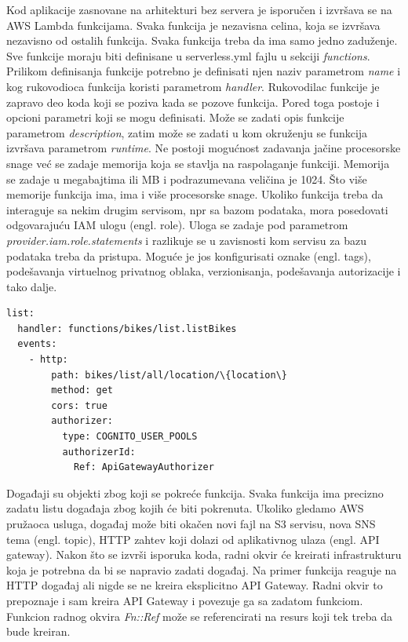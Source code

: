 \documentclass[12pt,oneside]{memoir}
\begin{document}
Kod aplikacije zasnovane na arhitekturi bez servera je isporučen i izvršava se na AWS Lambda funkcijama. Svaka funkcija je nezavisna celina, koja se izvršava nezavisno od ostalih funkcija. Svaka funkcija treba da ima samo jedno zaduženje. Sve funkcije moraju biti definisane u serverless.yml fajlu u sekciji \emph{functions}. Prilikom definisanja funkcije potrebno je definisati njen naziv parametrom \emph{name} i kog rukovodioca funkcija koristi parametrom \emph{handler}. Rukovodilac funkcije je zapravo deo koda koji se poziva kada se pozove funkcija. Pored toga postoje i opcioni parametri koji se mogu definisati. Može se zadati opis funkcije parametrom \emph{description}, zatim može se zadati u kom okruženju se funkcija izvršava parametrom \emph{runtime}. Ne postoji mogućnost zadavanja jačine procesorske snage već se zadaje memorija koja se stavlja na raspolaganje funkciji. Memorija se zadaje u megabajtima ili MB i podrazumevana veličina je 1024. Što više memorije funkcija ima, ima i više procesorske snage. Ukoliko funkcija treba da interaguje sa nekim drugim servisom, npr sa bazom podataka, mora posedovati odgovarajuću IAM ulogu (engl. role). Uloga se zadaje pod parametrom \emph{provider.iam.role.statements} i razlikuje se u zavisnosti kom servisu za bazu podataka treba da pristupa. Moguće je jos konfigurisati oznake (engl. tags), podešavanja virtuelnog privatnog oblaka, verzionisanja, podešavanja autorizacije i tako dalje.

\begin{lstlisting}[caption={Primer definisanja funkcije u serverles radnom okviru},captionpos=t]
list:
  handler: functions/bikes/list.listBikes
  events:
    - http:
        path: bikes/list/all/location/\{location\}
        method: get
        cors: true
        authorizer:
          type: COGNITO_USER_POOLS
          authorizerId:
            Ref: ApiGatewayAuthorizer
\end{lstlisting}
 
Događaji su objekti zbog koji se pokreće funkcija. Svaka funkcija ima precizno zadatu listu događaja zbog kojih će biti pokrenuta. Ukoliko gledamo AWS pružaoca usluga, događaj može biti okačen novi fajl na S3 servisu, nova SNS tema (engl. topic), HTTP zahtev koji dolazi od aplikativnog ulaza (engl. API gateway). Nakon što se izvrši isporuka koda, radni okvir će kreirati infrastrukturu koja je potrebna da bi se napravio zadati događaj. Na primer funkcija reaguje na HTTP događaj ali nigde se ne kreira eksplicitno API Gateway. Radni okvir to prepoznaje i sam kreira API Gateway i povezuje ga sa zadatom funkciom. Funkcion radnog okvira \emph{Fn::Ref} može se referencirati na resurs koji tek treba da bude kreiran.
 
\end{document}
